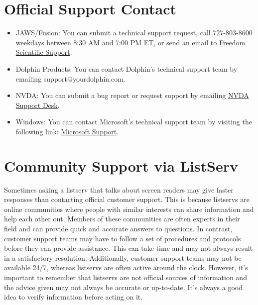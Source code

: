 \documentclass[14pt,letterpaper,twoside]{extreport}
\begin{document}
\begin{appendices}
\hypertarget{report}{}\section{Official Support Contact}\label{report}
\begin{itemize}[leftmargin=*]
\item JAWS/Fusion: You can submit a technical support request, call 727-803-8600 weekdays between 8:30 AM and 7:00 PM ET, or send an email to \href{support@freedomscientific.com}{Freedom Scientific Support}.
\item Dolphin Products: You can contact Dolphin’s technical support team by emailing support@yourdolphin.com.
\item NVDA: You can submit a bug report or request support by emailing \href{info@nvaccess.org}{NVDA Support Desk}.
\item Windows: You can contact Microsoft’s technical support team by visiting the following link: \href{https://support.microsoft.com/en-us/contactus/}{Microsoft Support}.
\end{itemize}
\hypertarget{listserv}{}\section{Community Support via ListServ}\label{listserv}
Sometimes asking a listserv that talks about screen readers may give faster responses than contacting official customer support. This is because listservs are online communities where people with similar interests can share information and help each other out. Members of these communities are often experts in their field and can provide quick and accurate answers to questions. In contrast, customer support teams may have to follow a set of procedures and protocols before they can provide assistance. This can take time and may not always result in a satisfactory resolution. Additionally, customer support teams may not be available 24/7, whereas listservs are often active around the clock. However, it’s important to remember that listservs are not official sources of information and the advice given may not always be accurate or up-to-date. It’s always a good idea to verify information before acting on it.


\end{appendices}
\end{document}
